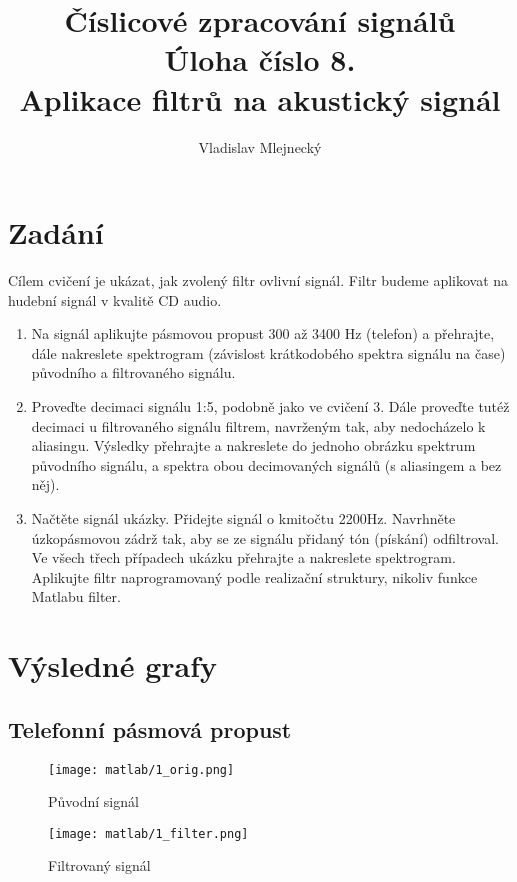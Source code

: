 \documentclass[11pt, a4paper]{article}
\author{Vladislav Mlejnecký}
\title{%
  Číslicové zpracování signálů\\
  \large Úloha číslo 8.\\
  Aplikace filtrů na akustický signál}
\begin{document}
    \maketitle

    \section{Zadání}
    
        Cílem cvičení je ukázat, jak zvolený filtr ovlivní signál. 
        Filtr budeme aplikovat na hudební signál v kvalitě CD audio.
    
        \begin{enumerate}
            \item        
            Na signál aplikujte pásmovou propust 300 až 3400 Hz (telefon) a přehrajte, dále nakreslete
            spektrogram (závislost krátkodobého spektra signálu na čase) původního a filtrovaného
            signálu.
            \item        
            Proveďte decimaci signálu 1:5, podobně jako ve cvičení 3.
            Dále proveďte tutéž decimaci u filtrovaného signálu filtrem, navrženým tak, aby
            nedocházelo k aliasingu. Výsledky přehrajte a nakreslete do jednoho obrázku spektrum
            původního signálu, a spektra obou decimovaných signálů (s aliasingem a bez něj).
            \item        
            Načtěte signál ukázky. Přidejte signál o kmitočtu 2200Hz. Navrhněte úzkopásmovou zádrž
            tak, aby se ze signálu přidaný tón (pískání) odfiltroval. Ve všech třech případech ukázku
            přehrajte a nakreslete spektrogram. Aplikujte filtr naprogramovaný podle realizační
            struktury, nikoliv funkce Matlabu filter.
        \end{enumerate}
        
    \section{Výsledné grafy}
        
        \subsection{Telefonní pásmová propust}
        
            \begin{figure}[H]
                \centering
                \begin{minipage}{.5\textwidth}
                    \centering
                    \texttt{[image: matlab/1\_orig.png]}
                    \caption{Původní signál}
                    \label{fig:1}
                \end{minipage}%
                \begin{minipage}{.5\textwidth}
                    \centering
                    \texttt{[image: matlab/1\_filter.png]}
                    \caption{Filtrovaný signál}
                    \label{fig:2}
                \end{minipage}
            \end{figure}
        
\end{document}
